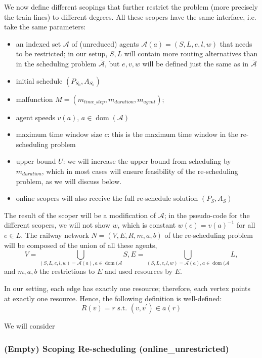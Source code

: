 \documentclass{article}
\DeclareMathOperator{\dom}{dom}
\begin{document}
We now define different scopings that further restrict the problem (more precisely the train lines) to different degrees. All these scopers have the same interface, i.e. take the same parameters:
\begin{itemize}
    \item an indexed set $\mathcal{A}$ of (unreduced) agents $\mathcal{A}(a)=(S,L,e,l,w)$ that needs to be restricted; in our setup, $S,L$ will contain more routing alternatives than in the scheduling problem $\bar{\mathcal{A}}$, but $e,v,w$ will be defined just the same as in $\bar{\mathcal{A}}$
    \item initial schedule $(P_{S_0},A_{S_0})$
    \item malfunction $M=(m_{time\_step},m_{duration},m_{agent})$;
    \item agent speeds $v(a)$, $a \in \dom(\mathcal{A})$
    \item maximum time window size $c$: this is the maximum time window in the re-scheduling problem
    \item upper bound $U$: we will increase the upper bound from scheduling by $m_{duration}$, which in most cases will ensure feasibility of the re-scheduling problem, as we will discuss below.
    \item online scopers will also receive the full re-schedule solution $(P_S,A_S)$
\end{itemize}
The result of the scoper will be a modification of $\mathcal{A}$;
in the pseudo-code for the different scopers, we will not show $w$, which is constant $w(e)= {v(a)}^{-1}$ for all $e \in L$. The railway network  $N=(V,E,R,m,a,b)$ of the re-scheduling problem will be composed of the union of all these agents,
\begin{equation}
V=\bigcup_{(S,L,e,l,w)=\mathcal{A}(a), a \in \dom(\mathcal{A}}S, E=\bigcup_{(S,L,e,l,w)=\mathcal{A}(a), a \in \dom(\mathcal{A}}L,
\end{equation}
and $m,a,b$ the restrictions to $E$ and used resources by $E$.


In our setting, each edge has exactly one resource; therefore, each vertex points at exactly one resource. Hence, the following definition is well-defined:
\begin{equation}
    R(v) = r \textrm{ s.t. } (v,v^\prime) \in a(r)
\end{equation}

We will consider


\subsubsection{(Empty) Scoping Re-scheduling (online\_unrestricted)} \label{subsubsec:scope_online_unrestricted}
\end{document}
